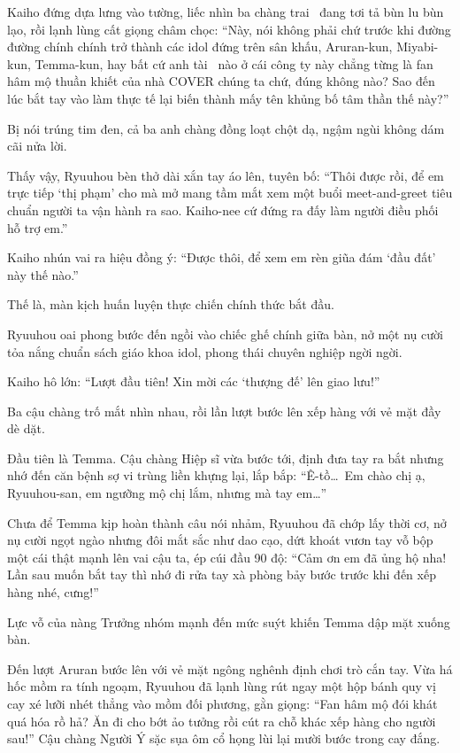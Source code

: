 \documentclass[../main.tex]{subfiles}
\begin{document}
Kaiho đứng dựa lưng vào tường, liếc nhìn ba chàng trai \hls\ đang tơi tả bùn lu bùn lạo, rồi lạnh lùng cất giọng châm chọc: ``Này, nói không phải chứ trước khi đường đường chính chính trở thành các idol đứng trên sân khấu, Aruran-kun, Miyabi-kun, Temma-kun, hay bất cứ anh tài \hls\ nào ở cái công ty này chẳng từng là fan hâm mộ thuần khiết của nhà COVER chúng ta chứ, đúng không nào? Sao đến lúc bắt tay vào làm thực tế lại biến thành mấy tên khủng bố tâm thần thế này?''

Bị nói trúng tim đen, cả ba anh chàng đồng loạt chột dạ, ngậm ngùi không dám cãi nửa lời.

Thấy vậy, Ryuuhou bèn thở dài xắn tay áo lên, tuyên bố: ``Thôi được rồi, để em trực tiếp `thị phạm' cho mà mở mang tầm mắt xem một buổi meet-and-greet tiêu chuẩn người ta vận hành ra sao. Kaiho-nee cứ đứng ra đấy làm người điều phối hỗ trợ em.''

Kaiho nhún vai ra hiệu đồng ý: ``Được thôi, để xem em rèn giũa đám `đầu đất' này thế nào.''

Thế là, màn kịch huấn luyện thực chiến chính thức bắt đầu.

\ct

Ryuuhou oai phong bước đến ngồi vào chiếc ghế chính giữa bàn, nở một nụ cười tỏa nắng chuẩn sách giáo khoa idol, phong thái chuyên nghiệp ngời ngời.

Kaiho hô lớn: ``Lượt đầu tiên! Xin mời các `thượng đế' lên giao lưu!''

Ba cậu chàng trố mắt nhìn nhau, rồi lần lượt bước lên xếp hàng với vẻ mặt đầy dè dặt.

Đầu tiên là Temma. Cậu chàng Hiệp sĩ vừa bước tới, định đưa tay ra bắt nhưng nhớ đến căn bệnh sợ vi trùng liền khựng lại, lắp bắp: ``Ê-tồ\dots\ Em chào chị ạ, Ryuuhou-san, em ngưỡng mộ chị lắm, nhưng mà tay em\dots''

Chưa để Temma kịp hoàn thành câu nói nhảm, Ryuuhou đã chớp lấy thời cơ, nở nụ cười ngọt ngào nhưng đôi mắt sắc như dao cạo, dứt khoát vươn tay vỗ bộp một cái thật mạnh lên vai cậu ta, ép cúi đầu 90 độ: ``Cảm ơn em đã ủng hộ nha! Lần sau muốn bắt tay thì nhớ đi rửa tay xà phòng bảy bước trước khi đến xếp hàng nhé, cưng!''

Lực vỗ của nàng Trưởng nhóm mạnh đến mức suýt khiến Temma dập mặt xuống bàn.

Đến lượt Aruran bước lên với vẻ mặt ngông nghênh định chơi trò cắn tay. Vừa há hốc mồm ra tính ngoạm, Ryuuhou đã lạnh lùng rút ngay một hộp bánh quy vị cay xé lưỡi nhét thẳng vào mồm đối phương, gằn giọng: ``Fan hâm mộ đói khát quá hóa rồ hả? Ăn đi cho bớt ảo tưởng rồi cút ra chỗ khác xếp hàng cho người sau!'' Cậu chàng Người Ý sặc sụa ôm cổ họng lùi lại mười bước trong cay đắng.
\end{document}
